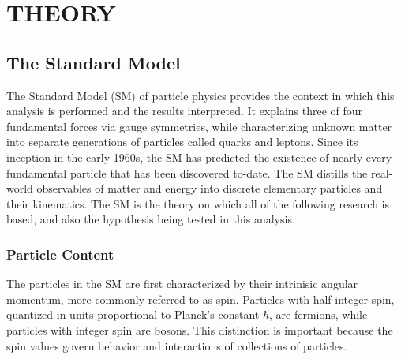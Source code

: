 %
%

\chapter{THEORY}
\label{chap:theory}
\section{The Standard Model}
\label{sec:sm}
The Standard Model (SM) of particle physics provides the context in which this analysis is performed and the results interpreted. 
It explains three of four fundamental forces via gauge symmetries, while characterizing unknown matter into
separate generations of particles called quarks and leptons. Since its inception in the early 1960s, the SM has predicted the existence of nearly every fundamental particle that has been discovered to-date.
The SM distills the real-world observables of matter and energy into discrete elementary particles and their kinematics. The SM is the theory on which all of the following research is based, and also the hypothesis being tested in this analysis.

\subsection{Particle Content}
The particles in the SM are first characterized by their intrinisic angular momentum, more commonly referred to as spin. Particles with half-integer spin, quantized in units proportional to Planck's constant $\hbar$, are fermions, while particles with integer spin are bosons.
This distinction is important because the spin values govern behavior and interactions of collections of particles. 

